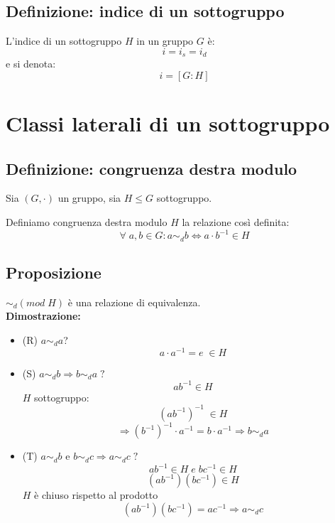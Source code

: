 \subsection{Definizione: indice di un sottogruppo}
L'indice di un sottogruppo \(H\) in un gruppo \(G\) è:
\[i=i_s=i_d\]
e si denota:
\[i=[G:H]\]

\section{Classi laterali di un sottogruppo}
\subsection{Definizione: congruenza destra modulo}
Sia \((G,\cdot)\) un gruppo, sia \(H\leq G\) sottogruppo.

Definiamo congruenza destra modulo \(H\) la relazione così definita:
\[\forall\; a,b\in G: a\sim _d b\Leftrightarrow a\cdot b^{-1}\in H\]

\subsection{Proposizione}
\(\sim _d(mod\;H)\) è una relazione di equivalenza.
\\\textbf{Dimostrazione:}
\begin{itemize}

	\item (R) \(a\sim _d a\)?
	\[a\cdot a^{-1}=e\;\in H\]

	\item (S) \(a\sim _d b\Rightarrow b\sim _d a\;?\)
	\[ab^{-1}\in H\]
	\(H\) sottogruppo:
	\[(ab^{-1})^{-1}\;\in H\]
	\[\Rightarrow (b^{-1})^{-1}\cdot a^{-1}=b\cdot a^{-1}\Rightarrow b\sim _d a\]

	\item (T) \(a\sim _d b\) e \(b\sim _d c\Rightarrow a\sim _d c\;?\)
	\[ab^{-1}\in H\;e\;bc^{-1}\in H\] 
	\[(ab^{-1})(bc^{-1})\in H\]
	\(H\) è chiuso rispetto al prodotto
	\[(ab^{-1})(bc^{-1})=ac^{-1}\Rightarrow a\sim _d c\]

\end{itemize}

